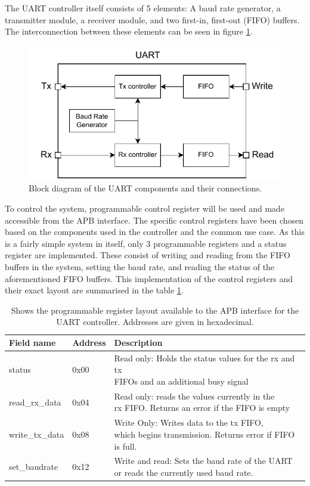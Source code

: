 \documentclass[./dissertation.tex]{subfiles}
\begin{document}
The UART controller itself consists of 5 elements: A baud rate generator, a transmitter module, a receiver module, and two first-in, first-out (FIFO) buffers. The interconnection between these elements can be seen in figure \ref{fig:uart_bd}.

\begin{figure}[H]
    \centering
    \includegraphics[width=0.7\linewidth]{subfiles/imgs/IP_Blocks_Pics/uart_bd.drawio.pdf}
    \caption{Block diagram of the UART components and their connections.}
    \label{fig:uart_bd}
\end{figure}

To control the system, programmable control register will be used and made accessible from the APB interface. The specific control registers have been chosen based on the components used in the controller and the common use case. As this is a fairly simple system in itself, only 3 programmable registers and a status register are implemented. These consist of writing and reading from the FIFO buffers in the system, setting the baud rate, and reading the status of the aforementioned FIFO buffers. This implementation of the control registers and their exact layout are summarised in the table \ref{tab:uart_regs}.

\begin{table}[H]
\centering
\caption{Shows the programmable register layout available to the APB interface for the UART controller. Addresses are given in hexadecimal.}
\label{tab:uart_regs}
\begin{tabular}{l|l|l}
\textbf{Field name}      & \textbf{Address} & \textbf{Description} \\ \hline
status          & 0x00    & \makecell[l]{Read only: Holds the status values for the rx and tx \\ FIFOs and an additional busy signal}            \\ \hline
read\_rx\_data  & 0x04    & \makecell[l]{Read only: reads the values currently in the \\ rx FIFO. Returns an error if the FIFO is empty}            \\ \hline
write\_tx\_data & 0x08    & \makecell[l]{Write Only: Writes data to the tx FIFO, \\ which begins transmission. Returns error if FIFO is full.}            \\ \hline
set\_baudrate   & 0x12    & \makecell[l]{Write and read: Sets the baud rate of the UART \\ or reads the currently used baud rate.}         
\end{tabular}
\end{table}
\end{document}
